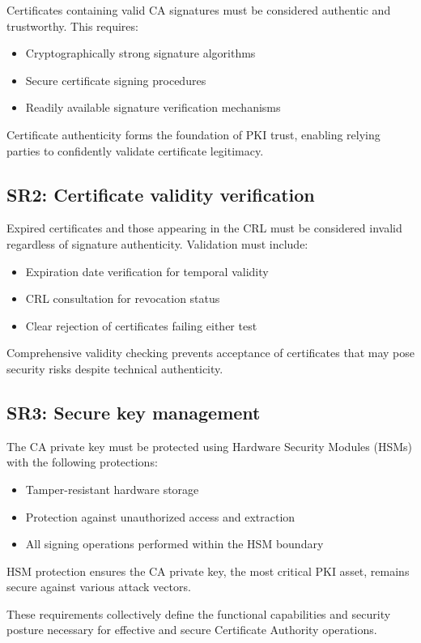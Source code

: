 Certificates containing valid CA signatures must be considered authentic and 
trustworthy. This requires:

\begin{itemize}
    \item Cryptographically strong signature algorithms
    \item Secure certificate signing procedures
    \item Readily available signature verification mechanisms
\end{itemize}
Certificate authenticity forms the foundation of PKI trust, enabling relying 
parties to confidently validate certificate legitimacy.

\subsection{SR2: Certificate validity verification}

Expired certificates and those appearing in the CRL must be considered invalid 
regardless of signature authenticity. Validation must include:

\begin{itemize}
    \item Expiration date verification for temporal validity
    \item CRL consultation for revocation status
    \item Clear rejection of certificates failing either test
\end{itemize}
Comprehensive validity checking prevents acceptance of certificates that may 
pose security risks despite technical authenticity.

\subsection{SR3: Secure key management}

The CA private key must be protected using Hardware Security Modules (HSMs) 
with the following protections:

\begin{itemize}
    \item Tamper-resistant hardware storage
    \item Protection against unauthorized access and extraction
    \item All signing operations performed within the HSM boundary
\end{itemize}
HSM protection ensures the CA private key, the most critical PKI asset, 
remains secure against various attack vectors.

These requirements collectively define the functional capabilities and security 
posture necessary for effective and secure Certificate Authority operations.